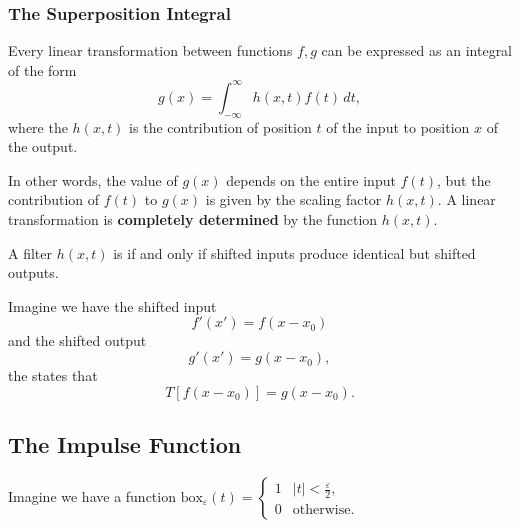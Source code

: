\subsubsection{The Superposition Integral}

Every linear transformation between functions $f, g$ can be expressed as an integral of the form \[
    g(x) = \int_{-\infty}^{\infty} h(x, t) f(t) \, dt,
\] where the $h(x, t)$ is the contribution of position $t$ of the input to position $x$ of the output.

In other words, the value of $g(x)$ depends on the entire input $f(t)$, but the contribution of $f(t)$ to $g(x)$ is given by the scaling factor $h(x, t)$. A linear transformation is \textbf{completely determined} by the function $h(x, t)$.


\begin{definition}\label{def:shift-invariant-filter}
    A filter $h(x, t)$ is  if and only if shifted inputs produce identical but shifted outputs.
\end{definition}


Imagine we have the shifted input \[
    f'(x') = f(x - x_0)
\] and the shifted output \[
    g'(x') = g(x - x_0),
\] the  states that \[
    T[f(x - x_0)] = g(x - x_0).
\]

\subsection{The Impulse Function}

\newcommand{\boxfn}{\mathrm{box}}

Imagine we have a function $\boxfn_\varepsilon(t) = \begin{cases}
    1 & |t| < \frac{\varepsilon}{2}, \\
    0 & \text{otherwise}.
\end{cases}$

\begin{figure}[ht!]
    \centering

\end{figure}

